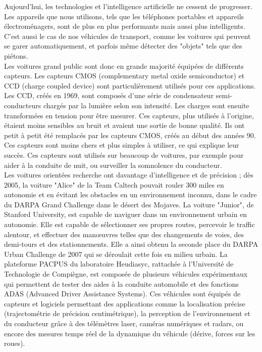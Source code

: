 Aujourd'hui, les technologies et l'intelligence artificielle ne cessent de progresser. Les appareils que nous utilisons, tels que les téléphones portables et appareils électroménagers, sont de plus en plus performants mais aussi plus intelligents. C'est aussi le cas de nos véhicules de transport, comme les voitures qui peuvent se garer automatiquement, et parfois même détecter des "objets" tels que des piétons.\\

Les voitures grand public sont donc en grande majorité équipées de différents capteurs. Les capteurs CMOS (complementary metal oxide semiconductor) et CCD (charge coupled device) sont particulièrement utilisés pour ces applications. Les CCD, créés en 1969, sont composés d'une série de condensateur semi-conducteurs chargés par la lumière selon son intensité. Les charges sont ensuite transformées en tension pour être mesurer. Ces capteurs, plus utilisés à l'origine, étaient moins sensibles au bruit et avaient une sortie de bonne qualité. Ils ont petit à petit été remplacés par les capteurs CMOS, créés au début des années 90. Ces capteurs sont moins chers et plus simples à utiliser, ce qui explique leur succès. Ces capteurs sont utilisés sur beaucoup de voitures, par exemple pour aider à la conduite de nuit, ou surveiller la somnolence du conducteur.\\

Les voitures orientées recherche ont davantage d'intelligence et de précision ; dès 2005, la voiture "Alice" de la Team Caltech pouvait rouler 300 miles en autonomie et en évitant les obstacles en un environnement inconnu, dans le cadre du DARPA Grand Challenge dans le désert des Mojaves. La voiture "Junior", de Stanford University, est capable de naviguer dans un environnement urbain en autonomie. Elle est capable de sélectionner ses propres routes, percevoir le traffic alentour, et effectuer des manœuvres telles que des changements de voies, des demi-tours et des stationnements. Elle a ainsi obtenu la seconde place du DARPA Urban Challenge de 2007 qui se déroulait cette fois en milieu urbain. La plateforme PACPUS du laboratoire Heudiasyc, rattachée à l'Université de Technologie de Compiègne, est composée de plusieurs véhicules expérimentaux qui permettent de tester des aides à la conduite automobile et des fonctions ADAS (Advanced Driver Assistance Systems). Ces véhicules sont équipés de capteurs et logiciels permettant des applications comme la localisation précise (trajectométrie de précision centimétrique), la perception de l'environnement et du conducteur grâce à des télémètres laser, caméras numériques et radars, ou encore des mesures temps réel de la dynamique du véhicule (dérive, forces sur les roues).\\

